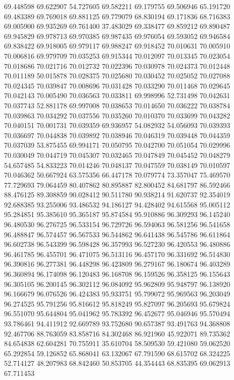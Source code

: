 69.448598
69.622907
54.727605
69.582211
69.179755
69.506946
65.191720
69.483389
69.769018
69.881125
69.779079
68.830194
69.171836
68.716383
69.005900
69.935269
69.761400
37.483029
69.338477
69.859212
69.890487
69.945829
69.978713
69.970385
69.987435
69.976054
69.593052
69.946584
69.838422
69.918005
69.979117
69.988247
69.918452
70.010631
70.005910
70.006816
69.979709
70.035253
69.915344
70.012097
70.013345
70.023054
70.018686
70.021716
70.012732
70.022396
70.030978
70.024373
70.012448
70.011189
50.015878
70.028375
70.025680
70.030452
70.025052
70.027088
70.024345
70.039847
70.008696
70.031428
70.033290
70.011468
70.029645
70.042143
70.005490
70.036563
70.033811
69.998996
52.731498
70.042631
70.037743
52.881178
69.997008
70.038653
70.014650
70.036222
70.038784
70.039863
70.034292
70.037556
70.035260
70.010370
70.033699
70.043282
70.040151
70.001731
70.039359
69.936957
54.082932
54.056093
70.039393
70.036697
70.044838
70.039892
70.038946
70.046319
70.039448
70.044359
70.037039
53.875455
69.994171
70.050795
70.042700
70.051054
70.029996
70.030049
70.044719
70.045307
70.032465
70.047849
70.045452
70.048279
54.657485
54.833223
70.014246
70.048137
70.047559
70.038149
70.010597
70.046362
50.667924
63.575356
66.447178
70.079774
73.357047
75.469570
77.729693
79.064459
80.407862
80.895887
82.800452
84.681797
86.592466
88.476125
89.308859
90.028412
90.511780
90.938214
91.620737
92.354019
92.688385
93.255006
93.486532
94.186127
94.428402
94.615568
95.005112
95.284851
95.385610
95.365187
95.874584
95.910886
96.309293
96.145240
96.480530
96.276725
96.533154
96.729726
96.594063
96.581256
96.541658
96.488847
96.574457
96.567533
96.544862
96.641438
96.545786
96.611864
96.602738
96.543399
96.598428
96.357993
96.527230
96.420553
96.480886
96.461785
96.455701
96.471075
96.513116
96.457170
96.331692
96.514830
96.390816
96.277381
96.448298
96.423809
96.279167
96.180674
96.403289
96.360894
96.174098
96.120483
96.168708
96.159526
96.358125
96.155643
96.305105
96.200145
96.302112
96.084092
95.962809
95.948797
96.138920
96.166679
96.076526
96.424383
95.933751
95.799072
95.969563
96.203049
96.274525
95.791256
95.816612
95.818249
95.827097
96.205693
95.679824
96.551070
95.644804
95.041962
95.783392
96.452677
95.046946
95.570494
93.786461
94.411912
92.669789
93.752680
90.657387
93.491763
94.368808
92.467706
88.763059
83.858716
84.302468
86.921960
45.922071
89.735362
84.654838
62.604281
70.755911
35.610704
58.509530
59.421080
59.062520
65.292854
59.126852
65.868041
63.132067
67.791590
68.615702
68.324225
52.714127
48.207983
68.842460
50.853705
44.354443
68.835395
69.062913
67.711453
